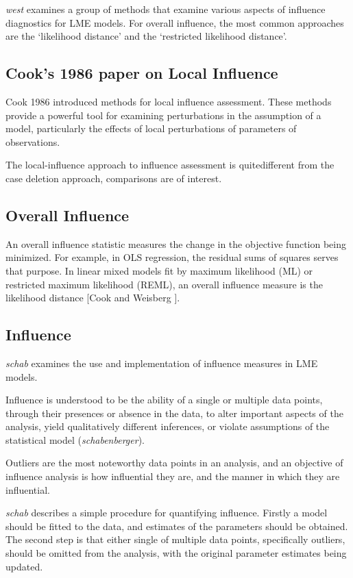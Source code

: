 \documentclass[]{article}
\begin{document}
	\emph{west} examines a group of methods that examine various aspects of influence diagnostics for LME models.
	For overall influence, the most common approaches are the `likelihood distance' and the `restricted likelihood distance'.
	
	\subsection{Cook's 1986 paper on Local Influence}%
	Cook 1986 introduced methods for local influence assessment. These methods provide a powerful tool for examining perturbations in the assumption of a model, particularly the effects of local perturbations of parameters of observations.
	
	The local-influence approach to influence assessment is quitedifferent from the case deletion approach, comparisons are of
	interest.
	
	
	
	\subsection{Overall Influence}
	An overall influence statistic measures the change in the objective function being minimized. For example, in
	OLS regression, the residual sums of squares serves that purpose. In linear mixed models fit by
	 maximum likelihood (ML) or  restricted maximum likelihood (REML), an overall influence measure is the  likelihood distance [Cook and Weisberg ].
	
	
	\subsection{Influence}
	
	\emph{schab} examines the use and implementation of
	influence measures in LME models.
	
	Influence is understood to be the ability of a single or multiple
	data points, through their presences or absence in the data, to
	alter important aspects of the analysis, yield qualitatively
	different inferences, or violate assumptions of the statistical
	model (\textit{schabenberger}).
	
	Outliers are the most noteworthy data points in an analysis, and
	an objective of influence analysis is how influential they are,
	and the manner in which they are influential.
	
	\emph{schab} describes a simple procedure for quantifying
	influence. Firstly a model should be fitted to the data, and
	estimates of the parameters should be obtained. The second step is
	that either single of multiple data points, specifically outliers,
	should be omitted from the analysis, with the original parameter
	estimates being updated. 
	
\end{document}
